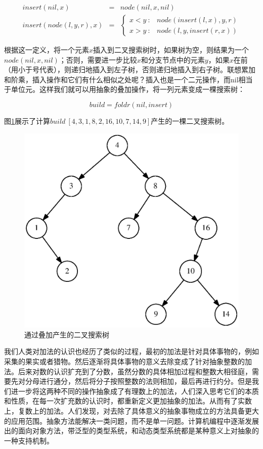 \documentclass{article}
\begin{document}
\[
\begin{array}{rcl}
  insert(nil, x) & = & node(nil, x, nil) \\
  insert(node(l, y, r), x) & = & \left.
  \begin{cases}
  x < y\ : & node(insert(l, x), y, r) \\
  x > y\ : & node(l, y, insert(r, x))
  \end{cases} \right.
\end{array}
\label{eq:BST-insert}
\]

根据这一定义，将一个元素$x$插入到二叉搜索树时，如果树为空，则结果为一个$node(nil, x, nil)$；否则，需要进一步比较$x$和分支节点中的元素$y$，如果$x$在前（用小于号代表），则递归地插入到左子树，否则递归地插入到右子树。联想累加和阶乘，插入操作和它们有什么相似之处呢？插入也是一个二元操作，而nil相当于单位元。这样我们就可以用抽象的叠加操作，将一列元素变成一棵搜索树：

\[
build = foldr(nil, insert)
\]

图\ref{fig:bst-example}展示了计算$build\ [4, 3, 1, 8, 2, 16, 10, 7, 14, 9]$产生的一棵二叉搜索树。

\begin{figure}[htbp]
  \centering
  \includegraphics[scale=0.5]{img/bst-example.ps}
  \caption{通过叠加产生的二叉搜索树}
  \label{fig:bst-example}
\end{figure}

我们人类对加法的认识也经历了类似的过程，最初的加法是针对具体事物的，例如采集的果实或者猎物。然后逐渐将具体事物的意义去除变成了针对抽象整数的加法。后来对数的认识扩充到了分数，虽然分数的具体相加过程和整数大相径庭，需要先对分母进行通分，然后将分子按照整数的法则相加，最后再进行约分。但是我们进一步将这两种不同的操作抽象成了有理数上的加法，人们深入思考它们的本质和性质，在每一次扩充数的认识时，都重新定义更加抽象的加法。从而有了实数上，复数上的加法。人们发现，对去除了具体意义的抽象事物成立的方法具备更大的应用范围。抽象方法能解决一类问题，而不是单一问题。计算机编程中逐渐发展出的面向对象方法，带泛型的类型系统，和动态类型系统都是某种意义上对抽象的一种支持机制。
\end{document}
